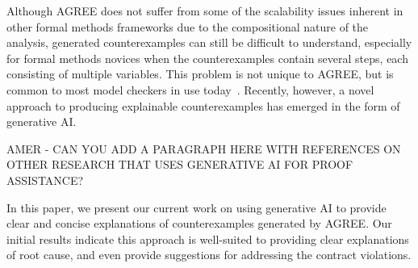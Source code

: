 Although AGREE does not suffer from some of the scalability issues inherent in other formal methods frameworks due to the compositional nature of the analysis, generated counterexamples can still be difficult to understand, especially for formal methods novices when the counterexamples contain several steps, each consisting of multiple variables.  This problem is not unique to AGREE, but is common to most model checkers in use today~\cite{?}.  
Recently, however, a novel approach to producing explainable counterexamples has emerged in the form of generative AI.

AMER - CAN YOU ADD A PARAGRAPH HERE WITH REFERENCES ON OTHER RESEARCH THAT USES GENERATIVE AI FOR PROOF ASSISTANCE?


In this paper, we present our current work on using generative AI to provide clear and concise explanations of counterexamples generated by AGREE.  Our initial results indicate this approach is well-suited to providing clear explanations of root cause, and even provide suggestions for addressing the contract violations.